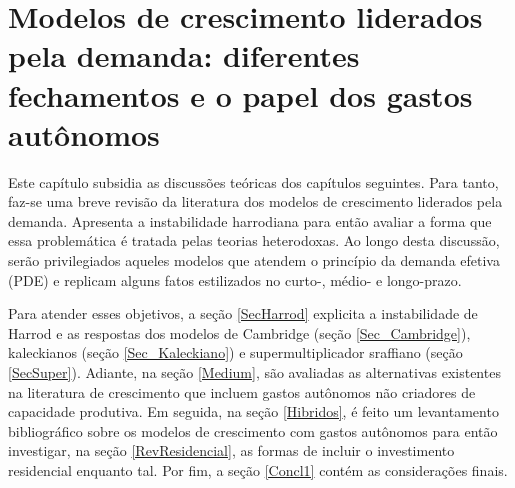 \chapter{Modelos de crescimento liderados pela demanda: diferentes fechamentos e o papel dos gastos autônomos}
\label{CapTeorico}



Este capítulo subsidia as discussões teóricas dos capítulos seguintes.
Para tanto, faz-se uma breve revisão da literatura dos modelos de crescimento liderados pela demanda. Apresenta a instabilidade harrodiana para então avaliar a forma que essa problemática é tratada pelas teorias heterodoxas.
Ao longo desta discussão, serão privilegiados aqueles modelos que atendem o princípio da demanda efetiva (PDE)  e replicam alguns fatos estilizados no curto-, médio- e longo-prazo.


Para atender esses objetivos, a seção \ref{SecHarrod} explicita a instabilidade de Harrod e as respostas dos modelos de Cambridge (seção \ref{Sec_Cambridge}), kaleckianos (seção \ref{Sec_Kaleckiano}) e supermultiplicador sraffiano (seção \ref{SecSuper}). 
Adiante, na seção \ref{Medium}, são avaliadas as alternativas existentes na literatura de crescimento que incluem gastos autônomos não criadores de capacidade produtiva.
Em seguida, na seção \ref{Hibridos}, é feito um levantamento bibliográfico sobre os modelos de crescimento com gastos autônomos para então investigar, na seção \ref{RevResidencial}, as formas de incluir o investimento residencial enquanto tal.
Por fim, a seção \ref{Concl1} contém as considerações finais.




%



\begin{comment}
mais especificamente:
\begin{itemize}
\item \textbf{Curto-prazo:} Determinação da poupança pelo investimento \cite{keynes_general_1936};
\item \textbf{Médio-prazo:} Relação positiva entre taxa de investimento e crescimento \cite{cesaratto_neo-kaleckian_2015};
\item \textbf{Longo-prazo:} Convergência ao grau de utilização ao normal\footnote{Por grau de utilização normal, adota-se a definição de \textcites[p.~423--4, Original de 1986]{ciccone_2017}: ``\textit{The `normal' utilization of capacity can therefore imply not only the expectation of a certain breadth and frequency of the fluctuations in demand, but also the expectation of the idleness of the excess capacity deliberately chosen by the entrepreneurs;}'' } \cites{ciccone_2017}{vianello_pace_1985}.
\end{itemize}
\end{comment}